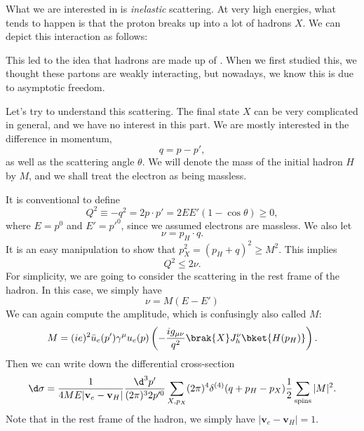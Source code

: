 \documentclass[a4paper]{article}
\begin{document}
What we are interested in is \emph{inelastic} scattering. At very high energies, what tends to happen is that the proton breaks up into a lot of hadrons $X$. We can depict this interaction as follows:
\begin{center}
\end{center}

This led to the idea that hadrons are made up of . When we first studied this, we thought these partons are weakly interacting, but nowadays, we know this is due to asymptotic freedom.

Let's try to understand this scattering. The final state $X$ can be very complicated in general, and we have no interest in this part. We are mostly interested in the difference in momentum,
\[
  q = p - p',
\]
as well as the scattering angle $\theta$. We will denote the mass of the initial hadron $H$ by $M$, and we shall treat the electron as being massless.

It is conventional to define
\[
  Q^2 \equiv - q^2 = 2 p \cdot p' = 2 E E' (1 - \cos \theta) \geq 0,
\]
where $E = p^0$ and $E' = p'^0$, since we assumed electrons are massless. We also let
\[
  \nu = p_H \cdot q.
\]
It is an easy manipulation to show that $p_X^2 = (p_H + q)^2 \geq M^2$. This implies
\[
  Q^2 \leq 2 \nu.
\]
For simplicity, we are going to consider the scattering in the rest frame of the hadron. In this case, we simply have
\[
  \nu = M(E - E')
\]
We can again compute the amplitude, which is confusingly also called $M$:
\[
  M = (ie)^2 \bar{u}_e (p') \gamma^\mu u_e (p) \left(-\frac{i g_{\mu\nu}}{q^2} \brak{X} J_h^\nu \bket{H(p_H)}\right).
\]
Then we can write down the differential cross-section
\[
  \d \sigma = \frac{1}{4 ME |\mathbf{v}_e - \mathbf{v}_H|} \frac{\d^3 p'}{(2\pi)^3 2 p'^0} \sum_{X, p_X} (2\pi)^4 \delta^{(4)} (q + p_H - p_X) \frac{1}{2} \sum_{\mathrm{spins}} |M|^2.
\]
Note that in the rest frame of the hadron, we simply have $|\mathbf{v}_e - \mathbf{v}_H| = 1$.
\end{document}
